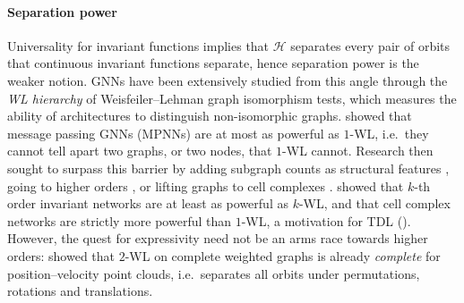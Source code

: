 \documentclass[mathematics,review,submit,moreauthors]{Definitions/mdpi}
\begin{document}
\paragraph{Separation power}
Universality for invariant functions implies that $\mathcal{H}$ separates every pair of orbits that continuous invariant functions separate, hence separation power is the weaker notion.
GNNs have been extensively studied from this angle through the \emph{WL hierarchy} of Weisfeiler--Lehman graph isomorphism tests, which measures the ability of architectures to distinguish non-isomorphic graphs.
\citet{xu2019,morris2019pacai} showed that message passing GNNs (MPNNs) are at most as powerful as $1$-WL, i.e.\ they cannot tell apart two graphs, or two nodes, that $1$-WL cannot.
Research then sought to surpass this barrier by adding subgraph counts as structural features \citep{bouritsas2021}, going to higher orders \citep{morris2019pacai,maron2020}, or lifting graphs to cell complexes \citep{bodnar2021a}.
\citet{maron2020} showed that $k$-th order invariant networks are at least as powerful as $k$-WL, and \citet{bodnar2021a} that cell complex networks are strictly more powerful than $1$-WL, a motivation for TDL ().
However, the quest for expressivity need not be an arms race towards higher orders: \citet{hordan2024} showed that $2$-WL on complete weighted graphs is already \emph{complete} for position--velocity point clouds, i.e.\ separates all orbits under permutations, rotations and translations.
\end{document}
